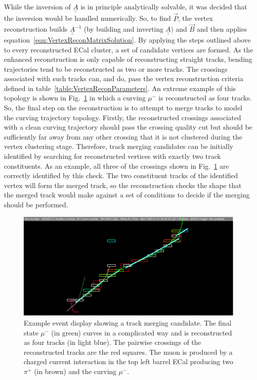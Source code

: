 While the inversion of $\underline{\underline{A}}$ is in principle analytically solvable, it was decided that the inversion would be handled numerically.  So, to find $\vec{P}$, the vertex reconstruction builds $\underline{\underline{A}}^{-1}$ (by building and inverting $\underline{\underline{A}})$ and $\vec{B}$ and then applies equation~\ref{eqn:VertexReconMatrixSolution}.
\newline
\newline
By applying the steps outlined above to every reconstructed ECal cluster, a set of candidate vertices are formed.  As the enhanced reconstruction is only capable of reconstructing straight tracks, bending trajectories tend to be reconstructed as two or more tracks.  The crossings associated with such tracks can, and do, pass the vertex reconstruction criteria defined in table~\ref{table:VertexReconParameters}.  An extreme example of this topology is shown in Fig.~\ref{fig:TrackMergingEventDisplay} in which a curving $\mu^-$ is reconstructed as four tracks.  So, the final step on the reconstruction is to attempt to merge tracks to model the curving trajectory topology.  Firstly, the reconstructed crossings associated with a clean curving trajectory should pass the crossing quality cut but should be sufficiently far away from any other crossing that it is not clustered during the vertex clustering stage.  Therefore, track merging candidates can be initially identified by searching for reconstructed vertices with exactly two track constituents.  As an example, all three of the crossings shown in Fig.~\ref{fig:TrackMergingEventDisplay} are correctly identified by this check.  The two constituent tracks of the identified vertex will form the merged track, so the reconstruction checks the shape that the merged track would make against a set of conditions to decide if the merging should be performed. 
\begin{figure}
  \centering
  \includegraphics[width=12cm]{images/selection/vertex_recon/track_merging_event_display.eps}
  \caption{Example event display showing a track merging candidate.  The final state $\mu^-$ (in green) curves in a complicated way and is reconstructed as four tracks (in light blue).  The pairwise crossings of the reconstructed tracks are the red squares.  The muon is produced by a charged current interaction in the top left barrel ECal producing two $\pi^+$ (in brown) and the curving $\mu^-$. }
  \label{fig:TrackMergingEventDisplay}
\end{figure}
